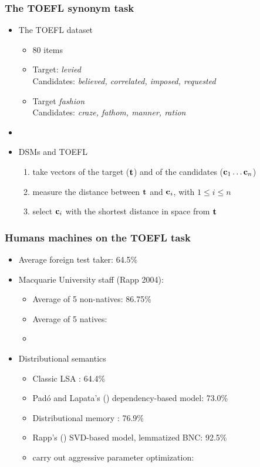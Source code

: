 \begin{frame}\frametitle{The TOEFL synonym task}

  \begin{itemize}
  \item The TOEFL dataset
    \begin{itemize}
    \item 80 items
    \item Target: \emph{levied}\\
      Candidates: \emph{believed, correlated, \alert<2->{imposed}, requested}
    \item<3-> Target \emph{fashion}\\
      Candidates: \emph{craze, fathom, \alert<4->{manner}, ration}
  \end{itemize}
    \item[]
  \item<5-> DSMs and TOEFL
  \begin{enumerate}
  \item take vectors of the target ($\Vector{t}$) and of the candidates
($\Vector{c}_1 \dots \Vector{c}_n$)
\item measure the distance between $\Vector{t}$ and $\Vector{c}_i$, with
$1 \leq i \leq n$ 
\item select $\Vector{c}_i$ with the shortest distance in space from $\Vector{t}$
\end{enumerate}
  \end{itemize}

\end{frame}


\begin{frame}
  \frametitle{Humans \vs machines on the TOEFL task}

  \begin{itemize}
  \item Average foreign test taker: 64.5\%
  \item<2-> Macquarie University staff (Rapp 2004):
    \begin{itemize}
    \item Average of 5 non-natives: 86.75\%
    \item Average of 5 natives: 
    \item[]
    \end{itemize}
  \item<3-> Distributional semantics
    \begin{itemize}
    \item Classic LSA \citep{Landauer:Dumais:97}: 64.4\%
    \item Padó and Lapata's (\citeyear{Pado:Lapata:07}) dependency-based model: 73.0\%
    \item Distributional memory \citep{Baroni:Lenci:10}: 76.9\%
    \item Rapp's (\citeyear{Rapp:04a}) SVD-based model, lemmatized BNC: 92.5\%
    \item \citet{Bullinaria:Levy:12} carry out aggressive parameter optimization: 
    \end{itemize}
  \end{itemize}

\end{frame}


